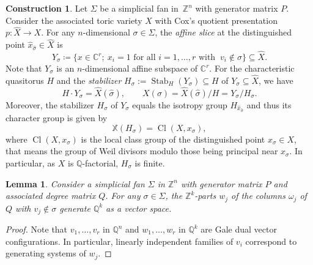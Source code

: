 \documentclass{amsart}
\newcommand{\C}{\mathbb{C}}
\newcommand{\Q}{\mathbb{Q}}
\newcommand{\Z}{\mathbb{Z}}
\DeclareMathOperator{\Cl}{Cl}
\DeclareMathOperator{\Stab}{Stab}
\theoremstyle{plain}
\newtheorem{lemma}[theorem]{Lemma}
\theoremstyle{definition}
\newtheorem{construction}[theorem]{Construction}
\begin{document}
\begin{construction}\label{constr:slice}
Let $\Sigma$ be a simplicial fan in~$\Z^n$ with generator
matrix $P$.
Consider the associated toric variety $X$ with Cox's quotient
presentation $p \colon \hat X \to X$.
For any $n$-dimensional $\sigma \in \Sigma$,
the \emph{affine slice} at the distinguished point
$\hat x_{\hat \sigma} \in \hat X$ is
$$
Y_\sigma
\coloneqq
\{ x \in \C^r; \ x_i=1 \text{ for all } i = 1, \ldots, r \text{ with } \  v_i \not\in \sigma \}
\subseteq
\hat X.
$$
Note that $Y_\sigma$ is an $n$-dimensional
affine subspace of $\C^r$.
For the characteristic quasitorus $H$ and the
\emph{stabilizer} $H_\sigma := \Stab_H(Y_\sigma) \subseteq H$
of $Y_\sigma \subseteq \hat X$, we have
$$
H \cdot Y_\sigma = \hat X(\hat\sigma),
\qquad
X(\sigma) = \hat X(\hat\sigma)/H = Y_\sigma/H_\sigma.
$$
Moreover, the stabilizer $H_\sigma$ of $Y_\sigma$
equals the isotropy group $H_{\hat x_{\hat \sigma}}$
and thus its character group is given by
$$
\mathbb{X}(H_\sigma) = \Cl(X,x_\sigma),
$$
where $\Cl(X,x_\sigma)$ is the local class group of the distinguished
point $x_\sigma \in X$, that means the group of Weil divisors
modulo those being principal near $x_\sigma$. In particular,
as $X$ is $\Q$-factorial, $H_\sigma$ is finite.
\end{construction}


\begin{lemma}\label{lem:finite}
Consider a simplicial fan $\Sigma$ in $\Z^n$ with generator
matrix $P$ and associated degree matrix $Q$.
For any $\sigma \in \Sigma$, the $\Z^k$-parts $w_j$ of
the columns $\omega_j$ of~$Q$ with $v_j \not\in \sigma$
generate $\Q^k$ as a vector space.
\end{lemma}

\begin{proof}
Note that $v_1,\ldots,v_r$ in $\Q^n$ and $w_1,\ldots,w_r$ in $\Q^k$
are Gale dual vector configurations.
In particular, linearly independent families of $v_i$
correspond to generating systems of $w_j$.
\end{proof}
\end{document}
